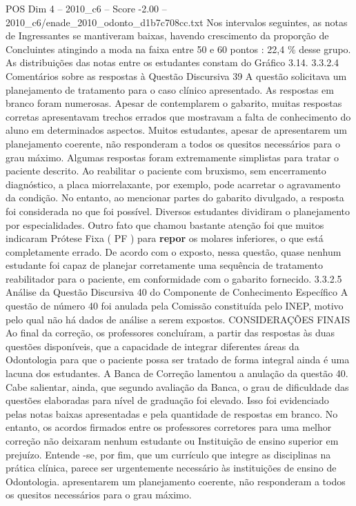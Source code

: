 \begin{textsample}{POS Dim 4 – 2010\_c6 – Score -2.00 – 2010\_c6/enade\_2010\_odonto\_d1b7c708cc.txt}
Nos intervalos seguintes, as notas de Ingressantes se mantiveram baixas, havendo crescimento da proporção de Concluintes atingindo a moda na faixa entre 50 e 60 pontos : 22,4 \% desse grupo.
As distribuições das notas entre os estudantes constam do Gráfico 3.14. 3.3.2.4 Comentários sobre as respostas à Questão Discursiva 39 A questão solicitava um planejamento de tratamento para o caso clínico apresentado.
As respostas em branco foram numerosas.
Apesar de contemplarem o gabarito, muitas respostas corretas apresentavam trechos errados que mostravam a falta de conhecimento do aluno em determinados aspectos.
Muitos estudantes, apesar de apresentarem um planejamento coerente, não responderam a todos os quesitos necessários para o grau máximo.
Algumas respostas foram extremamente simplistas para tratar o paciente descrito.
Ao reabilitar o paciente com bruxismo, sem encerramento diagnóstico, a placa miorrelaxante, por exemplo, pode acarretar o agravamento da condição.
No entanto, ao mencionar partes do gabarito divulgado, a resposta foi considerada no que foi possível.
Diversos estudantes dividiram o planejamento por especialidades.
Outro fato que chamou bastante atenção foi que muitos indicaram Prótese Fixa ( PF ) para \textbf{repor} os molares inferiores, o que está completamente errado.
De acordo com o exposto, nessa questão, quase nenhum estudante foi capaz de planejar corretamente uma sequência de tratamento reabilitador para o paciente, em conformidade com o gabarito fornecido. 3.3.2.5 Análise da Questão Discursiva 40 do Componente de Conhecimento Específico A questão de número 40 foi anulada pela Comissão constituída pelo INEP, motivo pelo qual não há dados de análise a serem expostos.
CONSIDERAÇÕES FINAIS Ao final da correção, os professores concluíram, a partir das respostas às duas questões disponíveis, que a capacidade de integrar diferentes áreas da Odontologia para que o paciente possa ser tratado de forma integral ainda é uma lacuna dos estudantes.
A Banca de Correção lamentou a anulação da questão 40.
Cabe salientar, ainda, que segundo avaliação da Banca, o grau de dificuldade das questões elaboradas para nível de graduação foi elevado.
Isso foi evidenciado pelas notas baixas apresentadas e pela quantidade de respostas em branco.
No entanto, os acordos firmados entre os professores corretores para uma melhor correção não deixaram nenhum estudante ou Instituição de ensino superior em prejuízo.
Entende -se, por fim, que um currículo que integre as disciplinas na prática clínica, parece ser urgentemente necessário às instituições de ensino de Odontologia. apresentarem um planejamento coerente, não responderam a todos os quesitos necessários para o grau máximo.

\end{textsample}
